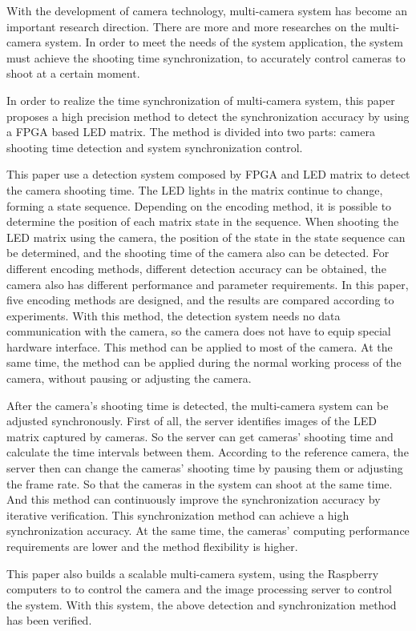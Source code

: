 
\begin{eabstract}

With the development of camera technology, multi-camera system has become an important research direction. There are more and more researches on the multi-camera system. In order to meet the needs of the system application, the system must achieve the shooting time synchronization, to accurately control cameras to shoot at a certain moment.

In order to realize the time synchronization of multi-camera system, this paper proposes a high precision method to detect the synchronization accuracy by using a FPGA based LED matrix. The method is divided into two parts: camera shooting time detection and system synchronization control.

This paper use a detection system composed by FPGA and LED matrix to detect the camera shooting time. The LED lights in the matrix continue to change, forming a state sequence. Depending on the encoding method, it is possible to determine the position of each matrix state in the sequence. When shooting the LED matrix using the camera, the position of the state in the state sequence can be determined, and the shooting time of the camera also can be detected. For different encoding methods, different detection accuracy can be obtained, the camera also has different performance and parameter requirements. In this paper, five encoding methods are designed, and the results are compared according to experiments. With this method, the detection system needs no data communication with the camera, so the camera does not have to equip special hardware interface. This method can be applied to most of the camera. At the same time, the method can be applied during the normal working process of the camera, without pausing or adjusting the camera.

After the camera's shooting time is detected, the multi-camera system can be adjusted synchronously. First of all, the server identifies images of the LED matrix captured by cameras. So the server can get cameras' shooting time and calculate the time intervals between them. According to the reference camera, the server then can change the cameras' shooting time by pausing them or adjusting the frame rate. So that the cameras in the system can shoot at the same time. And this method can continuously improve the synchronization accuracy by iterative verification. This synchronization method can achieve a high synchronization accuracy. At the same time, the cameras' computing performance requirements are lower and the method flexibility is higher.

This paper also builds a scalable multi-camera system, using the Raspberry computers to to control the camera and the image processing server to control the system. With this system, the above detection and synchronization method has been verified.

\end{eabstract}

